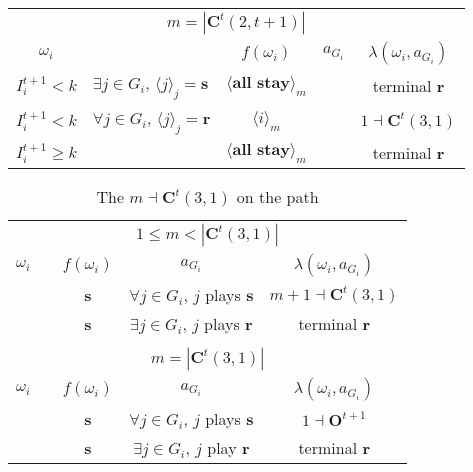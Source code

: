 \documentclass[12pt,letter]{article}
\newcommand{\Kappa}{\mathbf{C}}
\newcommand{\Omicron}{\mathbf{O}}
\theoremstyle{definition}
\theoremstyle{remark}
\theoremstyle{claim}
\begin{document}
\begin{table}[!htbp]
\begin{center}
\begin{tabular}{c l | c | c | c}
\multicolumn{5}{c}{$m= |\Kappa^t(2,t+1)|$}\\
$\omega_i$ 	 & 	   &	$f(\omega_i)$  &	$a_{G_i}$ & $\lambda(\omega_i,a_{G_i})$ \\
\hline
\hline
$I^{t+1}_i< k$  	& 	$\exists j\in G_i$, $\langle j \rangle_j=\textbf{s}$	& $\langle \textbf{all stay} \rangle_m$		&  	& terminal \textbf{r}\\
$I^{t+1}_i< k$  	& 	$\forall j\in G_i$, $\langle j \rangle_j=\textbf{r}$	& $\langle i \rangle_m$		&  	& $1\dashv \Kappa^t(3,1)$\\
$I^{t+1}_i\geq k$	 & 				& $\langle \textbf{all stay} \rangle_m$ 	& 		& terminal \textbf{r}\\
\hline
\end{tabular}
\end{center}
\end{table}




\clearpage









\begin{table}[!htbp]
\caption{The $m\dashv\Kappa^t(3,1)$ on the path}
\label{table:eqm_path_kt3}
\begin{center}
\begin{tabular}{c c | c | c | c}
\multicolumn{5}{c}{$1\leq m < |\Kappa^t(3,1)|$}\\
$\omega_i$ 	 & 	   &	$f(\omega_i)$  &	$a_{G_i}$ & $\lambda(\omega_i,a_{G_i})$ \\
\hline
\hline
  	&	& \textbf{s} & $\forall j\in G_i$, $j$ plays $\textbf{s}$ 	& $m+1\dashv \Kappa^t(3,1)$\\
  	&  & \textbf{s}  &  $\exists j\in G_i$, $j$ plays $\textbf{r}$  	& terminal \textbf{r}\\
\hline
\\
\multicolumn{5}{c}{$m= |\Kappa^t(3,1)|$}\\
$\omega_i$ 	 & 	   &	$f(\omega_i)$  &	$a_{G_i}$ & $\lambda(\omega_i,a_{G_i})$ \\
\hline
\hline
 	& 	& \textbf{s} & $\forall j\in G_i$, $j$ plays $\textbf{s}$ 	& $1\dashv \Omicron^{t+1}$\\
  	&  & \textbf{s}  &  $\exists j\in G_i$, $j$ play $\textbf{r}$  	& terminal \textbf{r}\\
\hline
\end{tabular}
\end{center}
\end{table}
\end{document}
